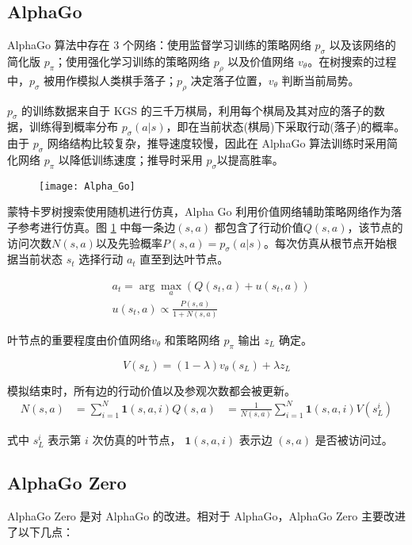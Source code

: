 \subsection{AlphaGo}
\label{sec:AlphaGo}
AlphaGo 算法中存在 3 个网络：使用监督学习训练的策略网络 $p_\sigma$ 以及该网络的简化版 $p_\pi$；使用强化学习训练的策略网络 $p_\rho$ 以及价值网络 $v_\theta$。在树搜索的过程中，$p_\sigma$ 被用作模拟人类棋手落子；$p_\rho$ 决定落子位置，$v_\theta$ 判断当前局势。

$p_\sigma$ 的训练数据来自于 KGS 的三千万棋局，利用每个棋局及其对应的落子的数据，训练得到概率分布 $p_\sigma(a|s)$，即在当前状态(棋局)下采取行动(落子)的概率。由于 $p_\sigma$ 网络结构比较复杂，推导速度较慢，因此在 AlphaGo 算法训练时采用简化网络 $p_\pi$ 以降低训练速度；推导时采用 $p_\sigma$以提高胜率。

\begin{figure}[!htbp]
    \centering
    \texttt{[image: Alpha\_Go]}
    \label{fig:Alpha_Go}
\end{figure}

蒙特卡罗树搜索使用随机进行仿真，Alpha Go 利用价值网络辅助策略网络作为落子参考进行仿真。图 \ref{fig:Alpha_Go} 中每一条边$(s, a)$ 都包含了行动价值$Q(s,a)$，该节点的访问次数$N(s,a)$以及先验概率$P(s,a) = p_\sigma(a|s)$。每次仿真从根节点开始根据当前状态 $s_t$ 选择行动 $a_t$ 直至到达叶节点。

\begin{equation}
\begin{aligned}
&a_t = \arg\max_a(Q(s_t,a) + u(s_t,a)) \\
&u(s_t,a) \propto \frac{P(s,a)}{1+N(s,a)}
\end{aligned}
\end{equation}

叶节点的重要程度由价值网络$v_\theta$ 和策略网络 $p_\pi$ 输出 $z_L$ 确定。

$$
V(s_L) = (1-\lambda)v_\theta(s_L) + \lambda z_L
$$

模拟结束时，所有边的行动价值以及参观次数都会被更新。
$$
\begin{aligned}
N(s,a) &= \sum_{i=1}^N\mathbf{1}(s,a,i)
Q(s,a) &= \frac{1}{N(s,a)}\sum_{i=1}^N\mathbf{1}(s,a,i)V(s_L^i)
\end{aligned}
$$

式中 $s_L^i$ 表示第 $i$ 次仿真的叶节点， $\mathbf{1}(s,a,i)$ 表示边 $(s,a)$ 是否被访问过。

\subsection{AlphaGo Zero}
AlphaGo Zero 是对 AlphaGo 的改进。相对于 AlphaGo，AlphaGo Zero 主要改进了以下几点：

